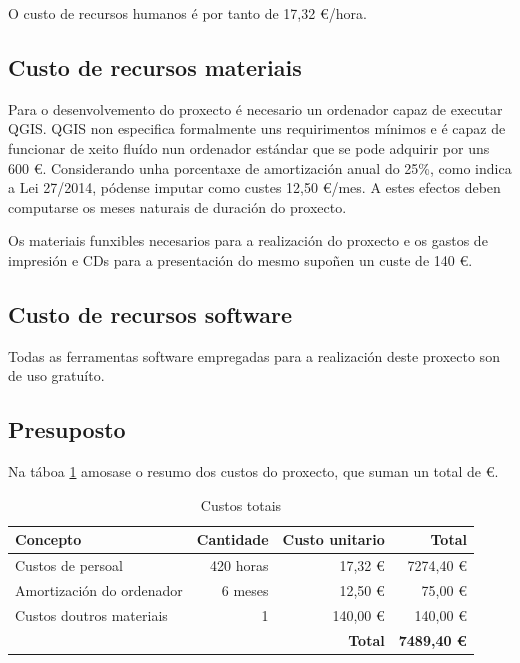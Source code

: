 O custo de recursos humanos é por tanto de 17,32 \euro/hora.

\subsection{Custo de recursos materiais}
Para o desenvolvemento do proxecto é necesario un ordenador capaz de executar QGIS. QGIS non especifica formalmente uns requirimentos mínimos e é capaz de funcionar de xeito fluído nun ordenador estándar que se pode adquirir por uns 600 \euro. Considerando unha porcentaxe de amortización anual do 25\%, como indica a Lei 27/2014\cite{Lei27/14}, pódense imputar como custes 12,50 \euro/mes. A estes efectos deben computarse os meses naturais de duración do proxecto.

Os materiais funxibles necesarios para a realización do proxecto e os gastos de impresión e CDs para a presentación do mesmo supoñen un custe de 140 \euro.

\subsection{Custo de recursos software}
Todas as ferramentas software empregadas para a realización deste proxecto son de uso gratuíto.

\subsection{Presuposto}
Na táboa \ref{tab:presuposto} amosase o resumo dos custos do proxecto, que suman un total de \euro.
\begin{table}[H]
\centering
\begin{tabularx}{\textwidth}{Xrrr} \toprule
	Concepto & Cantidade & Custo unitario & Total \\
	\midrule
	Custos de persoal & 420 horas & 17,32 \euro & 7274,40 \euro \\
	Amortización do ordenador & 6 meses & 12,50 \euro & 75,00 \euro \\
	Custos doutros materiais & 1 & 140,00 \euro & 140,00 \euro \\
	\midrule
	\multicolumn{3}{r}{\textbf{Total}} & \textbf{7489,40 \euro} \\
	\bottomrule
\end{tabularx}
\caption{Custos totais}
\label{tab:presuposto}
\end{table}

